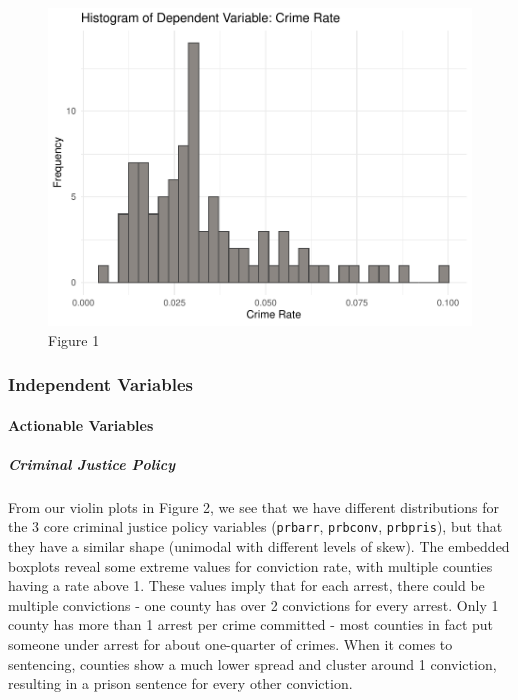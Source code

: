 \documentclass[]{article}
\let\oldparagraph\paragraph
\renewcommand{\paragraph}[1]{\oldparagraph{#1}\mbox{}}
\let\oldsubparagraph\subparagraph
\renewcommand{\subparagraph}[1]{\oldsubparagraph{#1}\mbox{}}
\begin{document}
\begin{figure}

{\centering \includegraphics{lab_3_v7_files/figure-latex/unnamed-chunk-10-1} 

}

\caption{Figure 1}\label{fig:unnamed-chunk-10}
\end{figure}

\hypertarget{independent-variables}{%
\subsubsection{Independent Variables}\label{independent-variables}}

\hypertarget{actionable-variables-1}{%
\paragraph{Actionable Variables}\label{actionable-variables-1}}

\hypertarget{criminal-justice-policy-1}{%
\subparagraph{Criminal Justice Policy}\label{criminal-justice-policy-1}}

From our violin plots in Figure 2, we see that we have different
distributions for the 3 core criminal justice policy variables
(\texttt{prbarr}, \texttt{prbconv}, \texttt{prbpris}), but that they
have a similar shape (unimodal with different levels of skew). The
embedded boxplots reveal some extreme values for conviction rate, with
multiple counties having a rate above 1. These values imply that for
each arrest, there could be multiple convictions - one county has over 2
convictions for every arrest. Only 1 county has more than 1 arrest per
crime committed - most counties in fact put someone under arrest for
about one-quarter of crimes. When it comes to sentencing, counties show
a much lower spread and cluster around 1 conviction, resulting in a
prison sentence for every other conviction.
\end{document}

